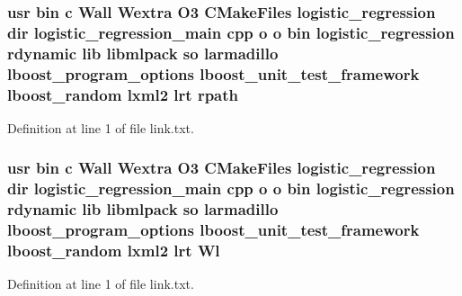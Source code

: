 \subsubsection[{rpath}]{\setlength{\rightskip}{0pt plus 5cm}usr bin c Wall Wextra O3 C\-Make\-Files logistic\-\_\-regression dir logistic\-\_\-regression\-\_\-main cpp o o bin logistic\-\_\-regression rdynamic lib libmlpack so larmadillo lboost\-\_\-program\-\_\-options lboost\-\_\-unit\-\_\-test\-\_\-framework lboost\-\_\-random lxml2 lrt rpath}\label{methods_2logistic__regression_2CMakeFiles_2logistic__regression_8dir_2link_8txt_a18699ead33e99b372c02d6bf204f32fc}


Definition at line 1 of file link.\-txt.

\subsubsection[{Wl}]{\setlength{\rightskip}{0pt plus 5cm}usr bin c Wall Wextra O3 C\-Make\-Files logistic\-\_\-regression dir logistic\-\_\-regression\-\_\-main cpp o o bin logistic\-\_\-regression rdynamic lib libmlpack so larmadillo lboost\-\_\-program\-\_\-options lboost\-\_\-unit\-\_\-test\-\_\-framework lboost\-\_\-random lxml2 lrt Wl}\label{methods_2logistic__regression_2CMakeFiles_2logistic__regression_8dir_2link_8txt_a778c287c1a3d1eff8dd9341674d856d5}


Definition at line 1 of file link.\-txt.

